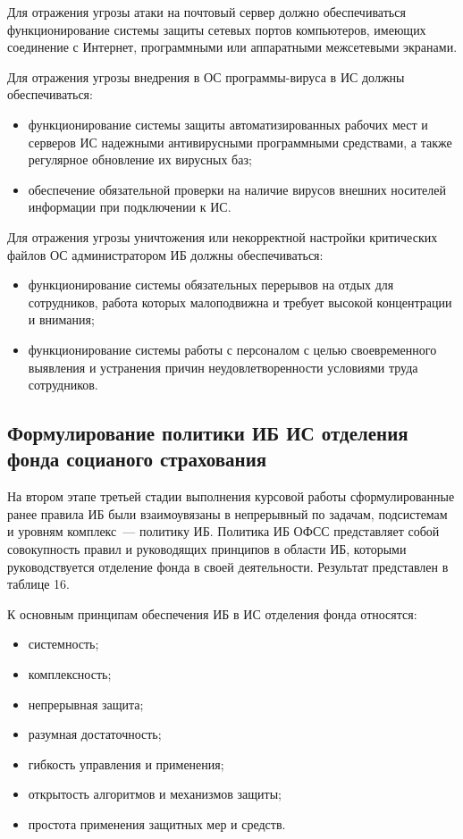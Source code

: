 \point Для отражения угрозы атаки на почтовый сервер должно
обеспечиваться функционирование системы защиты сетевых портов
компьютеров, имеющих соединение с Интернет, программными или
аппаратными межсетевыми экранами.

\point Для отражения угрозы внедрения в ОС программы-вируса в ИС
должны обеспечиваться:

\begin{itemize}
\item функционирование системы защиты автоматизированных рабочих мест
  и серверов ИС надежными антивирусными программными средствами, а
  также регулярное обновление их вирусных баз;
\item обеспечение обязательной проверки на наличие вирусов внешних
  носителей информации при подключении к ИС.
\end{itemize}

\point Для отражения угрозы уничтожения или некорректной настройки
критических файлов ОС администратором ИБ должны обеспечиваться:

\begin{itemize}
 \item функционирование системы обязательных перерывов на отдых для
   сотрудников, работа которых малоподвижна и требует высокой
   концентрации и внимания;
 \item функционирование системы работы с персоналом с целью
   своевременного выявления и устранения причин неудовлетворенности
   условиями труда сотрудников.
\end{itemize}

\subsection{Формулирование политики ИБ ИС отделения
  фонда социаного страхования}

\point На втором этапе третьей стадии выполнения курсовой работы
сформулированные ранее правила ИБ были взаимоувязаны в непрерывный по
задачам, подсистемам и уровням комплекс~--- политику ИБ. Политика ИБ
ОФСС представляет собой совокупность правил и руководящих принципов в
области ИБ, которыми руководствуется отделение фонда в своей
деятельности. Результат представлен в таблице 16.

\point К основным принципам обеспечения ИБ в ИС отделения фонда
относятся:

\begin{itemize}
\item системность;
\item комплексность;
\item непрерывная защита;
\item разумная достаточность;
\item гибкость управления и применения;
\item открытость алгоритмов и механизмов защиты;
\item простота применения защитных мер и средств.
\end{itemize}


